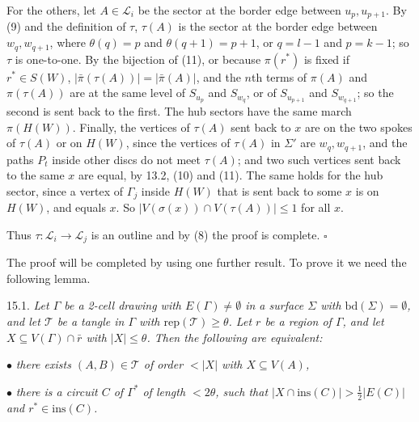 {For the others, let $A \in \mathscr{L}_i$ be the sector at the border edge between $u_p, u_{p+1}$. By (9) and the definition of $\tau$, $\tau(A)$ is the sector at the border edge between $w_q, w_{q+1}$, where $\theta(q) = p$ and $\theta(q+1) = p+1$, or $q = l-1$ and $p = k-1$; so $\tau$ is one-to-one. By the bijection of (11), or because $\pi(r^*)$ is fixed if $r^* \in S(W)$, $|\bar{\pi}(\tau(A))| = |\bar{\pi}(A)|$, and the $n$th terms of $\pi(A)$ and $\pi(\tau(A))$ are at the same level of $S_{u_p}$ and $S_{w_q}$, or of $S_{u_{p+1}}$ and $S_{w_{q+1}}$; so the second is sent back to the first. The hub sectors have the same march $\pi(H(W))$. Finally, the vertices of $\tau(A)$ sent back to $x$ are on the two spokes of $\tau(A)$ or on $H(W)$, since the vertices of $\tau(A)$ in $\Sigma'$ are $w_q, w_{q+1}$, and the paths $P_t$ inside other discs do not meet $\tau(A)$; and two such vertices sent back to the same $x$ are equal, by 13.2, (10) and (11). The same holds for the hub sector, since a vertex of $\Gamma_j$ inside $H(W)$ that is sent back to some $x$ is on $H(W)$, and equals $x$. So $|V(\sigma(x)) \cap V(\tau(A))| \le 1$ for all $x$.}

Thus $\tau \colon \mathscr{L}_i \to \mathscr{L}_j$ is an outline and by (8) the proof is complete. $\square$


The proof will be completed by using one further result. To prove it we need the following lemma.

15.1. \textit{Let $\Gamma$ be a 2-cell drawing with $E(\Gamma) \ne \emptyset$ in a surface $\Sigma$ with $\text{bd}(\Sigma) = \emptyset$, and let $\mathscr{T}$ be a tangle in $\Gamma$ with $\text{rep}(\mathscr{T}) \ge \theta$. Let $r$ be a region of $\Gamma$, and let $X \subseteq V(\Gamma) \cap \bar{r}$ with $|X| \le \theta$. Then the following are equivalent:}

\hspace*{12pt}$\bullet$ \textit{there exists $(A, B) \in \mathscr{T}$ of order $< |X|$ with $X \subseteq V(A)$,}

\hspace*{12pt}$\bullet$ \textit{there is a circuit $C$ of $\Gamma^*$ of length $< 2\theta$, such that $|X \cap \text{ins}(C)| > \frac{1}{2}|E(C)|$ and $r^* \in \text{ins}(C)$.}


